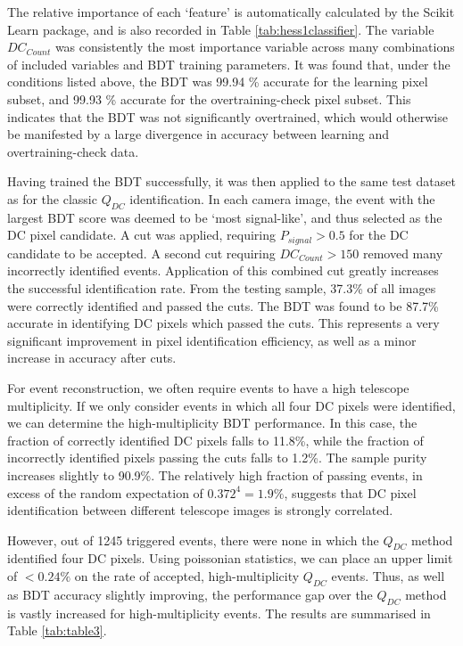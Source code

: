 \documentclass[]{article}
\begin{document}
The relative importance of each \textquoteleft feature' is automatically calculated by the Scikit Learn package, and is also recorded in Table \ref{tab:hess1classifier}. The variable $DC_{Count}$ was consistently the most importance variable across many combinations of included variables and BDT training parameters. It was found that, under the conditions listed above, the BDT was 99.94 \% accurate for the learning pixel subset, and 99.93 \%  accurate for the overtraining-check pixel subset. This indicates that the BDT was not significantly overtrained, which would otherwise be manifested by a large divergence in accuracy between learning and overtraining-check data.

Having trained the BDT successfully, it was then applied to the same test dataset as for the classic $Q_{DC}$ identification. In each camera image, the event with the largest BDT score was deemed to be \textquoteleft most signal-like', and thus selected as the DC pixel candidate. A cut was applied, requiring $P_{signal} > 0.5$ for the DC candidate to be accepted. A second cut requiring $DC_{Count} > 150$ removed many incorrectly identified events. Application of this combined cut greatly increases the successful identification rate. From the testing sample, 37.3\% of all images were correctly identified and passed the cuts. The BDT was found to be 87.7\% accurate in identifying DC pixels which passed the cuts. This represents a very significant improvement in pixel identification efficiency, as well as a minor increase in accuracy after cuts. 

For event reconstruction, we often require events to have a high telescope multiplicity. If we only consider events in which all four DC pixels were identified, we can determine the high-multiplicity BDT performance. In this case, the fraction of correctly identified DC pixels falls to 11.8\%, while the fraction of incorrectly identified pixels passing the cuts falls to 1.2\%. The sample purity increases slightly to 90.9\%. The relatively high fraction of passing events, in excess of the random expectation of $0.372^{4}=1.9 \%$, suggests that DC pixel identification between different telescope images is strongly correlated. 

However, out of 1245 triggered events, there were none in which the $Q_{DC}$ method identified four DC pixels. Using poissonian statistics, we can place an upper limit of $<0.24 \%$ on the rate of accepted, high-multiplicity $Q_{DC}$ events. Thus, as well as BDT accuracy slightly improving, the performance gap over the $Q_{DC}$ method is vastly increased for high-multiplicity events. The results are summarised in Table \ref{tab:table3}.
\end{document}
